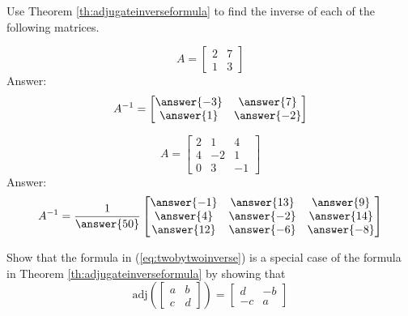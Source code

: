 \documentclass{ximera}
\begin{document}
 
\begin{problem}
Use Theorem \ref{th:adjugateinverseformula} to find the inverse of each of the following matrices.
  \begin{problem}\label{prob:adjinverse1}
  $$A=\begin{bmatrix}2&7\\1&3\end{bmatrix}$$
  Answer:
  $$A^{-1}=\begin{bmatrix}\answer{-3}&\answer{7}\\\answer{1}&\answer{-2}\end{bmatrix}$$
  \end{problem}
   
  \begin{problem}\label{prob:adjinverse2}
  $$A=\begin{bmatrix}2&1&4\\4&-2&1\\0&3&-1\end{bmatrix}$$
  Answer:
  $$A^{-1}=\frac{1}{\answer{50}}\begin{bmatrix}\answer{-1}&\answer{13}&\answer{9}\\\answer{4}&\answer{-2}&\answer{14}\\\answer{12}&\answer{-6}&\answer{-8}\end{bmatrix}$$
  \end{problem}
\end{problem}
 
\begin{problem}\label{prob:2by2adjugate}
Show that the formula in (\ref{eq:twobytwoinverse}) is a special case of the formula in Theorem \ref{th:adjugateinverseformula} by showing that
$$\mbox{adj}\left(\begin{bmatrix}a&b\\c&d\end{bmatrix}\right)=\begin{bmatrix}d&-b\\-c&a\end{bmatrix}$$
\end{problem}
\end{document}
